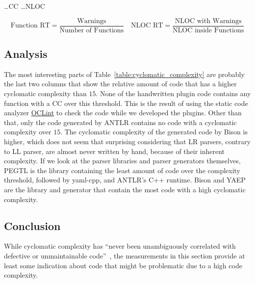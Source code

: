 \begin{table}[H]
\begin{adjustbox}{max width=\textwidth}
\begin{threeparttable}
  \vspace{0.2cm}
  \begin{tablenotes}
    \item
        \hspace{1.65cm}
        …\glsdesc{CC}
        \hspace{1.7cm}
        …\glsdesc{NLOC}
    \item
      \[
       \text{Function RT} = \frac{\text{Warnings}}{\text{Number of Functions}}\quad
       \text{NLOC RT} = \frac{\text{NLOC with Warnings}}{\text{NLOC inside Functions}}
      \]
  \end{tablenotes}

  \end{threeparttable}
  \end{adjustbox}
\end{table}

\subsection{Analysis}

The most interesting parts of Table~\ref{table:cyclomatic_complexity} are probably the last two columns that show the relative amount of code that has a higher cyclomatic complexity than $15$. None of the handwritten plugin code contains any function with a \gls{CC} over this threshold. This is the result of using the static code analyzer \href{http://oclint.org}{OCLint} to check the code while we developed the plugins. Other than that, only the code generated by \gls{ANTLR} contains no code with a cyclomatic complexity over $15$. The cyclomatic complexity of the generated code by Bison is higher, which does not seem that surprising considering that LR parsers, contrary to LL parser, are almost never written by hand, because of their inherent complexity. If we look at the parser libraries and parser generators themselves, \gls{PEGTL} is the library containing the least amount of code over the complexity threshold, followed by yaml-cpp, and ANTLR’s C++ runtime. Bison and \gls{YAEP} are the library and generator that contain the most code with a high cyclomatic complexity.

\subsection{Conclusion}

While cyclomatic complexity has “never been unambiguously correlated with defective or unmaintainable code”~\cite{martin2017c++}, the measurements in this section provide at least some indication about code that might be problematic due to a high code complexity.

